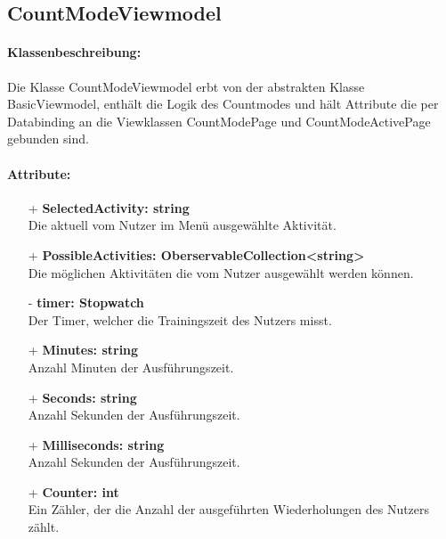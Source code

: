\documentclass[a4paper,12pt]{article}
\begin{document}
\subsection{CountModeViewmodel}
\paragraph{Klassenbeschreibung:}
Die Klasse CountModeViewmodel erbt von der abstrakten Klasse BasicViewmodel, enthält die Logik des Countmodes und hält Attribute die per Databinding an die Viewklassen CountModePage und CountModeActivePage gebunden sind.
\paragraph{Attribute:}
\begin{itemize}
	\item[+] \textbf{SelectedActivity: string} \\ Die aktuell vom Nutzer im Menü ausgewählte Aktivität. 
	\item[+] \textbf{PossibleActivities: OberservableCollection<string>} \\ Die möglichen Aktivitäten die vom Nutzer ausgewählt werden können. 
	\item[-] \textbf{timer: Stopwatch} \\ Der Timer, welcher die Trainingszeit des Nutzers misst. 
	\item[+] \textbf{Minutes: string} \\ Anzahl Minuten der Ausführungszeit. 
	\item[+] \textbf{Seconds: string} \\ Anzahl Sekunden der Ausführungszeit. 
	\item[+] \textbf{Milliseconds: string} \\ Anzahl Sekunden der Ausführungszeit. 
	\item[+] \textbf{Counter: int} \\ Ein Zähler, der die Anzahl der ausgeführten Wiederholungen des Nutzers zählt. 
\end{itemize}
\end{document}
